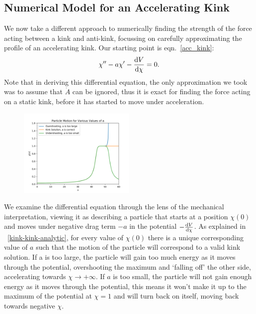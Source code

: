 \documentclass[11pt, oneside,titlepage]{article}  	%
\numberwithin{equation}{section}
\newcommand{\drv}{\ensuremath{\textup{d}}}
\begin{document}
\subsection{Numerical Model for an Accelerating Kink}
We now take a different approach to numerically finding the strength of the force acting between a kink and anti-kink, focussing on carefully approximating the profile of an accelerating kink. Our starting point is eqn.~\ref{acc_kink}:
 \begin{equation}
 \chi'' - a\chi' - \frac{\drv V }{\drv \chi}=0.
 \end{equation}
 Note that in deriving this differential equation, the only approximation we took was to assume that $\dot{A}$ can be ignored, thus it is exact for finding the force acting on a static kink, before it has started to move under acceleration.\par
   \begin{figure}
 \vspace{-10pt}
\centering
 \includegraphics[width=0.5\textwidth]{over_under.png}
  \label{over_under}
\end{figure} 
 We examine the differential equation through the lens of the mechanical interpretation, viewing it as describing a particle that starts at a position $\chi(0)$ and moves under negative drag term $-a$ in the potential $- \frac{\drv V }{\drv \chi}$. As explained in \textsection~\ref{kink-kink-analytic}, for every value of $\chi(0)$ there is a unique corresponding value of $a$ such that the motion of the particle will correspond to a valid kink solution. If a is too large, the particle will gain too much energy as it moves through the potential, overshooting the maximum and `falling off' the other side, accelerating towards $\chi \rightarrow +\infty$. If $a$ is too small, the particle will not gain enough energy as it moves through the potential, this means it won't make it up to the maximum of the potential at  $\chi=1$ and will turn back on itself, moving back towards negative $\chi$.\par
\end{document}

